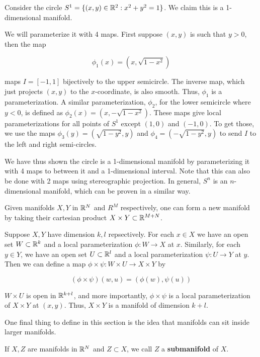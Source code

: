 \begin{example}
    Consider the circle $S^1 = \{(x,y) \in \mathbb{R}^2 : x^2 + y^2 = 1\}$. We claim this is a 1-dimensional manifold. 

    We will parameterize it with 4 maps. First suppose $(x,y)$ is such that $y > 0$, then the map 

    \[\phi_1(x) = (x,\sqrt{1 - x^2})\]

    maps $I = [-1,1]$ bijectively to the upper semicircle. The inverse map, which just projects $(x,y)$ to the $x$-coordinate, is also smooth. Thus, $\phi_1$ is a parameterization. A similar parameterization, $\phi_2$, for the lower semicircle where $y < 0$, is defined as $\phi_2(x) = (x,-\sqrt{1-x^2})$. These maps give local parameterizations for all points of $S^1$ except $(1,0)$ and $(-1,0)$. To get those, we use the maps $\phi_3(y) = (\sqrt{1-y^2},y)$ and $\phi_4 =(-\sqrt{1-y^2},y)$ to send $I$ to the left and right semi-circles. 

    We have thus shown the circle is a 1-dimensional manifold by parameterizing it with 4 maps to between it and a 1-dimensional interval. Note that this can also be done with 2 maps using stereographic projection. In general, $S^n$ is an $n$-dimensional manifold, which can be proven in a similar way. 
\end{example}

\begin{example}
    Given manifolds $X,Y$ in $\mathbb{R}^N$ and $R^M$ respectively, one can form a new manifold by taking their cartesian product $X \times Y \subset \mathbb{R}^{M+N}$. 

    Suppose $X,Y$ have dimension $k,l$ repsectively. For each $x \in X$ we have an open set $W \subset \mathbb{R}^k$ and a local parameterization $\phi: W \to X$ at $x$. Similarly, for each $y \in Y$, we have an open set $U \subset \mathbb{R}^l$ and a local parameterization $\psi: U \to Y$ at $y$. Then we can define a map $\phi \times \psi: W \times U \to X \times Y$ by 

    \[(\phi \times \psi)(w,u) = (\phi(w),\psi(u))\]

    $W \times U$ is open in $\mathbb{R}^{k+l}$, and more importantly, $\phi \times \psi$ is a local parameterization of $X \times Y$ at $(x,y)$. Thus, $X \times Y$ is a manifold of dimension $k + l$. 
\end{example}

One final thing to define in this section is the idea that manifolds can sit inside larger manifolds. 

\begin{definition}
    If $X,Z$ are manifolds in $\mathbb{R}^N$ and $Z \subset X$, we call $Z$ a \textbf{submanifold} of $X$. 
\end{definition}

